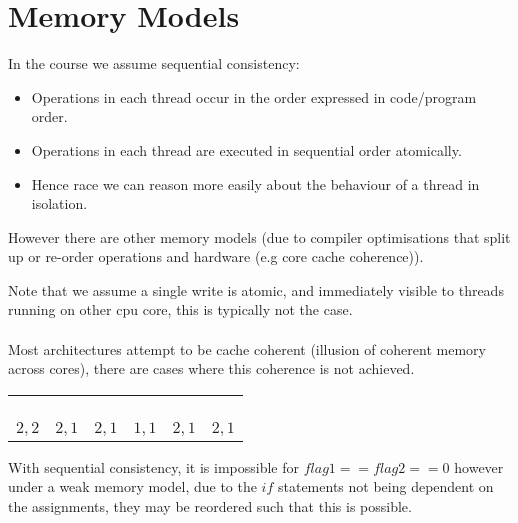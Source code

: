 \documentclass{report}
\begin{document}
\section*{Memory Models}
In the course we assume sequential consistency:
\begin{itemize}
	\item Operations in each thread occur in the order expressed in code/program order.
	\item Operations in each thread are executed in sequential order atomically.
	\item Hence race we can reason more easily about the behaviour of a thread in isolation.
\end{itemize}
However there are other memory models (due to compiler optimisations that split up or re-order operations and hardware (e.g core cache coherence)).
\begin{minipage}{0.5 \textwidth}
\end{minipage}
\begin{minipage}{0.5 \textwidth}
\end{minipage}
Note that we assume a single write is atomic, and immediately visible to threads running on other cpu core, this is typically not the case.
\\
\\ Most architectures attempt to be cache coherent (illusion of coherent memory across cores), there are cases where this coherence is not achieved.
\begin{center}
	\begin{tabular}{c c c c c c}
		\threada{$a = 1$} & \threada{$a = 1$} & \threada{$a = 1$} & \threadb{$b = 2$} & \threadb{$b = 2$} & \threadb{$b = 2$} \\
		\threada{$b = 1$} & \threadb{$b = 2$} & \threadb{$b = 2$} & \threadb{$a = 2$} & \threada{$b = 1$} & \threada{$b = 1$} \\
		\threadb{$b = 2$} & \threada{$b = 1$} & \threadb{$a = 2$} & \threada{$a = 1$} & \threadb{$a = 2$} & \threada{$b = 1$} \\
		\threadb{$a = 2$} & \threadb{$a = 2$} & \threada{$b = 1$} & \threada{$b = 1$} & \threada{$b = 1$} & \threadb{$a = 2$} \\
		$2,2$             & $2,1$             & $2,1$             & $1,1$             & $2,1$             & $2,1$             \\
	\end{tabular}
\end{center}
\begin{minipage}{0.5 \textwidth}
\end{minipage}
\begin{minipage}{0.5 \textwidth}
\end{minipage}
With sequential consistency, it is impossible for $flag1 == flag2 == 0$ however under a weak memory model, due to the $if$ statements not being dependent on the assignments, they may be reordered such that this is possible.
\end{document}
